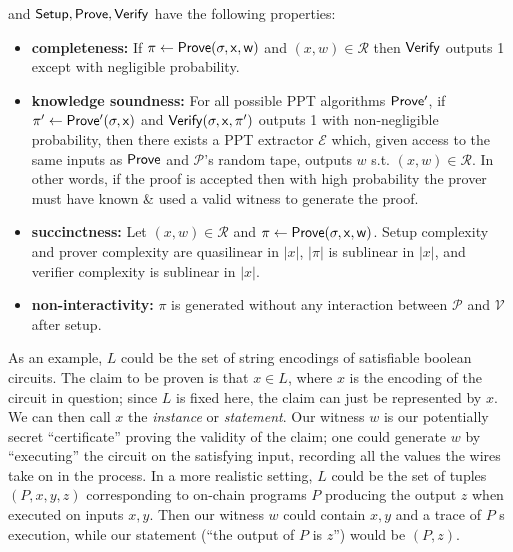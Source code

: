 \noindent and $\sf{Setup}, \sf{Prove}, \sf{Verify}$ have the following properties:
\begin{itemize}
    \item \textbf{completeness:} If $\pi \leftarrow \sf{Prove}(\sigma, x, w)$ and $(x, w) \in \mathcal{R}$ then $\sf{Verify}$ outputs 1 except with negligible probability.
    \item \textbf{knowledge soundness:} For all possible PPT algorithms $\sf{Prove'}$, if $\pi' \leftarrow \sf{Prove'}(\sigma, x)$ and $\sf{Verify}(\sigma, x, \pi')$ outputs 1 with non-negligible probability, then there exists a PPT extractor $\mathcal{E}$ which, given access to the same inputs as $\sf{Prove}$ and $\mathcal{P}$'s random tape, outputs $w$ s.t. $(x, w) \in \mathcal{R}$. In other words, if the proof is accepted then with high probability the prover must have known \& used a valid witness to generate the proof. 
    \item \textbf{succinctness:} Let $(x, w) \in \mathcal{R}$ and $\pi \leftarrow \sf{Prove}(\sigma, x, w)$. Setup complexity and prover complexity are quasilinear in $|x|$, $|\pi|$ is sublinear in $|x|$, and verifier complexity is sublinear in $|x|$.
    \item \textbf{non-interactivity:} $\pi$ is generated without any interaction between $\mathcal{P}$ and $\mathcal{V}$ after setup.
\end{itemize}

\noindent As an example, $L$ could be the set of string encodings of satisfiable boolean circuits. The claim to be proven is that $x \in L$, where $x$ is the encoding of the circuit in question; since $L$ is fixed here, the claim can just be represented by $x$. We can then call $x$ the \textit{instance} or \textit{statement}. Our witness $w$ is our potentially secret ``certificate'' proving the validity of the claim; one could generate $w$ by ``executing'' the circuit on the satisfying input, recording all the values the wires take on in the process. In a more realistic setting, $L$ could be the set of tuples $(P, x, y, z)$ corresponding to on-chain programs $P$ producing the output $z$ when executed on inputs $x, y$. Then our witness $w$ could contain $x, y$ and a trace of $P$
s execution, while our statement (``the output of $P$ is $z$'') would be $(P, z)$. 

